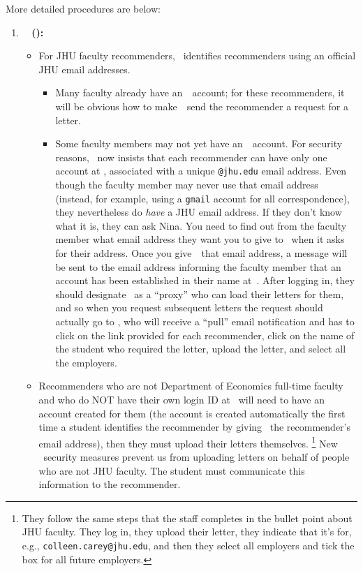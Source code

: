\documentclass{econtex}
\begin{document}
More detailed procedures are below:
\begin{enumerate}

\item {\bf \EJM ~ (\EJMLink):}
\begin{itemize}
\item For JHU faculty recommenders, \EJM~identifies recommenders using
  an official JHU email addresses.  

\begin{itemize}
\item Many faculty already have an~\EJM~account; for these
  recommenders, it will be obvious how to make~\EJM~send the
  recommender a request for a letter.

\item Some faculty members may not yet have an~\EJM~account.  
For security reasons, \EJM~now insists that each
  recommender can have only one account at \EJM, associated with a
  unique \texttt{@jhu.edu} email address.  Even though the faculty member may never use
  that email address (instead, for example, using a \texttt{gmail}
  account for all correspondence), they nevertheless do {\it have} a
  JHU email address.  If they don't know what it is, they can ask
  Nina.  You need to find out from the faculty member what email
  address they want you to give to \EJM~when it asks for their address.  Once you
  give~\EJM~that email address, a message will be sent to the email
  address informing the faculty member that an account has been
  established in their name at~\EJM.  After logging in, they should
  designate \JMStaffEmail~as a ``proxy'' who can load their letters
  for them, and so when you request subsequent letters the request should
  actually go to \JMStaffEmail, who will receive a ``pull'' email
  notification and has to click on the link provided for each
  recommender, click on the name of the student who required the
  letter, upload the letter, and select all the employers.

\end{itemize}


\item Recommenders who are not Department of Economics full-time faculty and who do NOT have their own
login ID at \EJM~will need to have an account created for them (the account is created automatically the first time a student identifies the recommender by giving \EJM~the recommender's email address), then they must upload their letters themselves. \footnote{They follow the same steps that the
    staff completes in the bullet point about JHU faculty.  They
    log in, they upload their letter, they indicate that it's for, e.g.,
    \texttt{colleen.carey@jhu.edu}, and then they select all employers and tick the box for all
    future employers.}
New \EJM~security measures prevent us from uploading letters on behalf of people
who are not JHU faculty.  The student must communicate this information to
  the recommender.


\end{itemize}
\end{enumerate}
\end{document}
